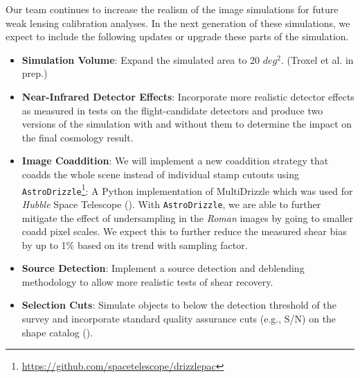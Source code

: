 \documentclass[fleqn,usenatbib]{mnras}
\begin{document}
Our team continues to increase the realism of the image simulations for future weak lensing calibration analyses. In the next generation of these simulations, we expect to include the following updates or upgrade these parts of the simulation. 
\begin{itemize}
    \setlength\itemsep{1em}
    \item \textbf{Simulation Volume}: Expand the simulated area to 20 $deg^{2}$. (Troxel et al. in prep.)
    
    \item \textbf{Near-Infrared Detector Effects}: Incorporate more realistic detector effects as measured in tests on the flight-candidate detectors and produce two versions of the simulation with and without them to determine the impact on the final cosmology result.
    
    \item \textbf{Image Coaddition}: We will implement a new coaddition strategy that coadds the whole scene instead of individual stamp cutouts using  \texttt{AstroDrizzle}\footnote{\url{https://github.com/spacetelescope/drizzlepac}}: A Python implementation of MultiDrizzle which was used for \emph{Hubble} Space Telescope (\citealt{2003hstc.conf..325B}). With \texttt{AstroDrizzle}, we are able to further mitigate the effect of undersampling in the \emph{Roman} images by going to smaller coadd pixel scales. We expect this to further reduce the measured shear bias by up to 1\% based on its trend with sampling factor.
    
    \item \textbf{Source Detection}: Implement a source detection and deblending methodology to allow more realistic tests of shear recovery.
    
    \item \textbf{Selection Cuts}: Simulate objects to below the detection threshold of the survey and incorporate standard quality assurance cuts (e.g., S/N) on the shape catalog (\citealt{2017ApJ...841...24S}). 
\end{itemize}
\end{document}
